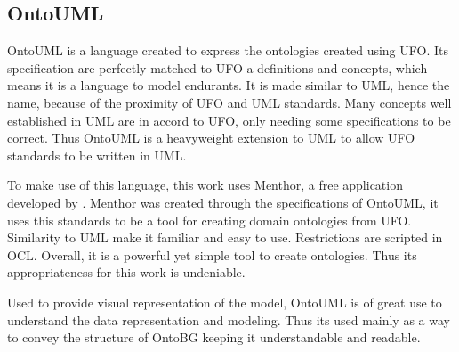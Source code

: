 \subsection{OntoUML}


OntoUML is a language created to express the ontologies created using UFO. Its specification are perfectly matched to UFO-a definitions and concepts, which means it is a language to model endurants. It is made similar to UML, hence the name, because of the proximity of UFO and UML standards. Many concepts well established in UML are in accord to UFO, only needing some specifications to be correct. Thus OntoUML is a heavyweight extension to UML to allow UFO standards to be written in UML. 

To make use of this language, this work uses Menthor, a free application developed by \citeauthor{guizzardi_ontological_2005}. Menthor was created through the specifications of OntoUML, it uses this standards to be a tool for creating domain ontologies from UFO. Similarity to UML make it familiar and easy to use. Restrictions are scripted in OCL. Overall, it is a powerful yet simple tool to create ontologies. Thus its appropriateness for this work is undeniable.

Used to provide visual representation of the model, OntoUML is of great use to understand the data representation and modeling. Thus its used mainly as a way to convey the structure of OntoBG keeping it understandable and readable.